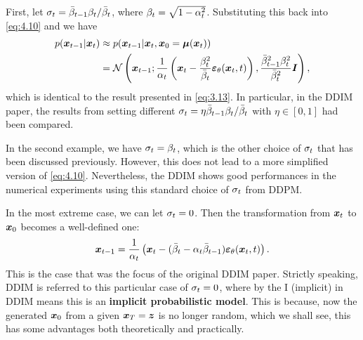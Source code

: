 First, let $\sigma_t=\bar{\beta}_{t-1}\beta_t/\bar{\beta}_t$, where $\beta_t=\sqrt{1-\alpha_t^2}$. Substituting this back into \cref{eq:4.10} and we have
\begin{align}
    p(\bm{x}_{t-1}|\bm{x}_{t})&\approx p(\bm{x}_{t-1}|\bm{x}_{t},\bm{x}_0=\bm{\mu}(\bm{x}_{t}))\nonumber\\
    &=\mathcal{N}\left( \bm{x}_{t-1};\frac{1}{\alpha_t}\left(\bm{x}_{t}-\frac{\beta_t^2}{\bar{\beta}_t}\bm{\varepsilon}_\theta(\bm{x}_{t},t)\right), \frac{\bar{\beta}_{t-1}^2\beta_t^2}{\bar{\beta}_t^2}\bm{I} \right),
    \label{eq:4.11}
\end{align}
which is identical to the result presented in \cref{eq:3.13}. In particular, in the DDIM paper, the results from setting different $\sigma_t=\eta\bar{\beta}_{t-1}\beta_t/\bar{\beta}_t$ with $\eta\in[0,1]$ had been compared.

In the second example, we have $\sigma_t=\beta_t$, which is the other choice of $\sigma_t$ that has been discussed previously. However, this does not lead to a more simplified version of \cref{eq:4.10}. Nevertheless, the DDIM shows good performances in the numerical experiments using this standard choice of $\sigma_t$ from DDPM. 

In the most extreme case, we can let $\sigma_t=0$. Then the transformation from $\bm{x}_{t}$ to $\bm{x}_0$ becomes a well-defined one:
\begin{equation}
    \label{eq:4.12}
\bm{x}_{t-1}=\frac{1}{\alpha_t}\left( \bm{x}_{t}-(\bar{\beta}_t-\alpha_t\bar{\beta}_{t-1})\bm{\varepsilon}_\theta(\bm{x}_{t},t)  \right).
\end{equation}
This is the case that was the focus of the original DDIM paper. Strictly speaking, DDIM is referred to this particular case of $\sigma_t=0$, where by the I (implicit) in DDIM means this is an \textbf{implicit probabilistic model}. This is because, now the generated $\bm{x}_0$ from a given $\bm{x}_T=\bm{z}$ is no longer random, which we shall see, this has some advantages both theoretically and practically. 

